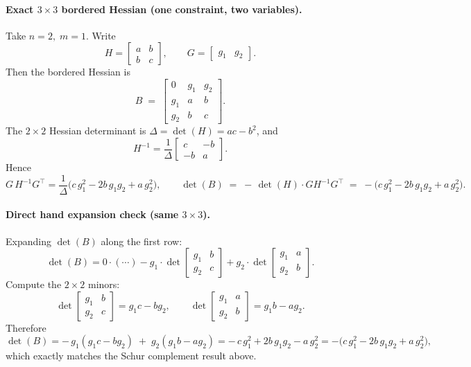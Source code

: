\documentclass[12pt]{article}
\begin{document}
\paragraph{Exact \(3\times 3\) bordered Hessian (one constraint, two variables).}
Take \(n=2,\; m=1\). Write
\[
H=\begin{bmatrix} a & b\\ b & c\end{bmatrix},\qquad
G=\begin{bmatrix} g_1 & g_2\end{bmatrix}.
\]
Then the bordered Hessian is
\[
B \;=\;
\begin{bmatrix}
0 & g_1 & g_2 \\
g_1 & a & b \\
g_2 & b & c
\end{bmatrix}.
\]
The \(2\times 2\) Hessian determinant is \(\Delta=\det(H)=ac-b^2\), and
\[
H^{-1}=\frac{1}{\Delta}\begin{bmatrix} c & -b\\ -b & a\end{bmatrix}.
\]
Hence
\[
G\,H^{-1}G^\top
= \frac{1}{\Delta}\bigl(c\,g_1^2 - 2b\,g_1 g_2 + a\,g_2^2\bigr),
\qquad
\det(B) \;=\; -\,\det(H)\cdot G H^{-1}G^\top
\;=\; -\bigl(c\,g_1^2 - 2b\,g_1 g_2 + a\,g_2^2\bigr).
\]

\paragraph{Direct hand expansion check (same \(3\times 3\)).}
Expanding \(\det(B)\) along the first row:
\[
\det(B)
= 0\cdot(\cdots)
- g_1\cdot \det\!\begin{bmatrix} g_1 & b\\ g_2 & c\end{bmatrix}
+ g_2\cdot \det\!\begin{bmatrix} g_1 & a\\ g_2 & b\end{bmatrix}.
\]
Compute the \(2\times 2\) minors:
\[
\det\!\begin{bmatrix} g_1 & b\\ g_2 & c\end{bmatrix}=g_1 c - b g_2,
\qquad
\det\!\begin{bmatrix} g_1 & a\\ g_2 & b\end{bmatrix}=g_1 b - a g_2.
\]
Therefore
\[
\det(B)
= -\,g_1(g_1 c - b g_2)\;+\;g_2(g_1 b - a g_2)
= -\,c\,g_1^2 + 2b\,g_1 g_2 - a\,g_2^2
= -\bigl(c\,g_1^2 - 2b\,g_1 g_2 + a\,g_2^2\bigr),
\]
which exactly matches the Schur complement result above.
\end{document}
